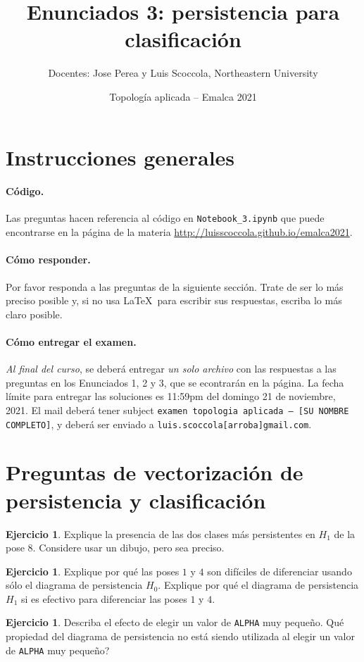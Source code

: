\documentclass[12pt,reqno,oneside]{article}
\title{Enunciados 3: persistencia para clasificaci\'on}
\date{Topolog\'{i}a aplicada -- Emalca 2021 }
\author{Docentes: Jose Perea y Luis Scoccola, Northeastern University}
\DeclareRobustCommand\squelch[1]{%
    \BeginAccSupp{method=plain,ActualText={}}#1\EndAccSupp{}}
\theoremstyle{definition}
\newtheorem{pregunta}[theorem]{Ejercicio}
\begin{document}
\maketitle

\section{Instrucciones generales}
%
\paragraph{C\'odigo.}
Las preguntas hacen referencia al c\'odigo en \texttt{Notebook\_3.ipynb} que puede encontrarse en la p\'agina de la materia
\url{http://luisscoccola.github.io/emalca2021}.

\paragraph{C\'omo responder.}
Por favor responda a las preguntas de la siguiente secci\'on. 
Trate de ser lo m\'as preciso posible y, si no usa \LaTeX~para escribir sus respuestas, escriba lo m\'as claro posible.

\paragraph{C\'omo entregar el examen.}
\textit{Al final del curso}, se deber\'a entregar \textit{un solo archivo} con las respuestas a las preguntas en los Enunciados 1, 2 y 3, que se econtrar\'an en la p\'agina.
La fecha l\'imite para entregar las soluciones es 11:59pm del domingo 21 de noviembre, 2021.
El mail deber\'a tener subject \texttt{examen topologia aplicada -- [SU NOMBRE COMPLETO]}, y deber\'a ser enviado a \squelch{\texttt{luis.scoccola[arroba]gmail.com}}.

\section{Preguntas de vectorizaci\'on de persistencia y clasificaci\'on}

\begin{pregunta}
	Explique la presencia de las dos clases m\'as persistentes en $H_1$ de la pose $8$.
	Considere usar un dibujo, pero sea preciso.
\end{pregunta}

\begin{pregunta}
	Explique por qu\'e las poses $1$ y $4$ son dif\'iciles de diferenciar usando s\'olo el diagrama de persistencia $H_0$.
	Explique por qu\'e el diagrama de persistencia $H_1$ si es efectivo para diferenciar las poses $1$ y $4$.
\end{pregunta}

\begin{pregunta}
	Describa el efecto de elegir un valor de \texttt{ALPHA} muy peque\~no.
	Qu\'e propiedad del diagrama de persistencia no est\'a siendo utilizada al elegir un valor de \texttt{ALPHA} muy peque\~no?
\end{pregunta}
\end{document}
